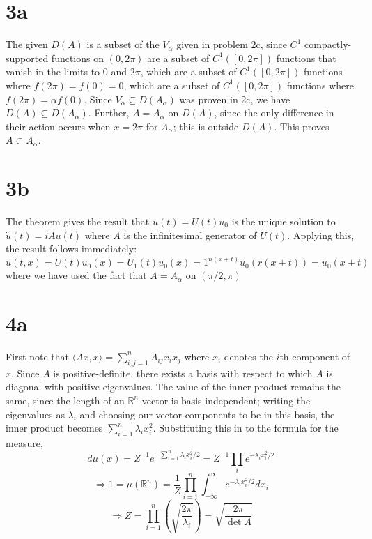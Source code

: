 \documentclass{article}
\begin{document}
\section*{3a}
The given $D(A)$ is a subset of the $V_{\alpha}$ given in problem 2c, since $C^{1}$ compactly-supported functions on $(0,2\pi)$ are a subset
of $C^{1}([0,2\pi])$ functions that vanish in the limits to $0$ and $2\pi$, which are a subset of $C^{1}([0,2\pi])$ functions where
$f(2\pi)=f(0)=0$, which are a subset of $C^{1}([0,2\pi])$ functions where $f(2\pi)=\alpha f(0)$.
Since $V_{\alpha}\subseteq D(A_{\alpha})$ was proven in 2c, we have $D(A)\subseteq D(A_{\alpha})$.
Further, $A=A_{\alpha}$ on $D(A)$, since the only difference in their action occurs when $x=2\pi$ for $A_{\alpha}$; this is outside $D(A)$.
This proves $A\subset A_{\alpha}$.

\section*{3b} %
The theorem gives the result that $u(t)=U(t)u_{0}$ is the unique solution to $\dot{u}(t)=iAu(t)$ where $A$ is the infinitesimal generator of
$U(t)$.
Applying this, the result follows immediately:
\[
  u(t,x) = U(t)u_{0}(x) = U_{1}(t)u_{0}(x)=1^{n(x+t)}u_{0}(r(x+t))=u_{0}(x+t)
\]
where we have used the fact that $A=A_{\alpha}$ on $(\pi/2,\pi)$

\section*{4a}
First note that $\langle Ax,x \rangle=\sum_{i,j=1}^{n}A_{ij}x_{i}x_{j}$ where $x_{i}$ denotes the $i$th component of $x$.
Since $A$ is positive-definite, there exists a basis with respect to which $A$ is diagonal with positive eigenvalues.
The value of the inner product remains the same, since the length of an $\mathbb{R}^{n}$ vector is basis-independent;
writing the eigenvalues as $\lambda_{i}$ and choosing our vector components to be in this basis,
the inner product becomes $\sum_{i=1}^{n}\lambda_{i}x_{i}^{2}$.
Substituting this in to the formula for the measure,
\[
  d\mu(x)=Z^{-1}e^{-\sum_{i=1}^{n}\lambda_{i}x_{i}^{2}/2}=Z^{-1}\prod_{i}e^{-\lambda_{i}x_{i}^{2}/2}
\]
\[
  \Rightarrow 1=\mu(\mathbb{R}^{n})=\frac{1}{Z}\prod_{i=1}^{n}\int_{-\infty}^{\infty}e^{-\lambda_{i}x_{i}^{2}/2}dx_{i}
\]
\[
  \Rightarrow Z=\prod_{i=1}^{n}\left( \sqrt{\frac{2\pi}{\lambda_{i}}} \right)=\sqrt{\frac{2\pi}{\det A}}
\]
\end{document}
